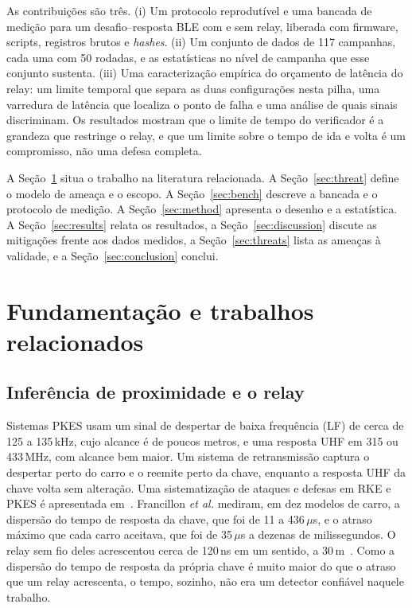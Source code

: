 \documentclass{ieeeaccess}
\begin{document}
As contribuições são três. (i) Um protocolo reprodutível e uma bancada de medição para um desafio--resposta BLE com e sem relay, liberada com firmware, scripts, registros brutos e \emph{hashes}. (ii) Um conjunto de dados de 117 campanhas, cada uma com 50 rodadas, e as estatísticas no nível de campanha que esse conjunto sustenta. (iii) Uma caracterização empírica do orçamento de latência do relay: um limite temporal que separa as duas configurações nesta pilha, uma varredura de latência que localiza o ponto de falha e uma análise de quais sinais discriminam. Os resultados mostram que o limite de tempo do verificador é a grandeza que restringe o relay, e que um limite sobre o tempo de ida e volta é um compromisso, não uma defesa completa.

A Seção~\ref{sec:background} situa o trabalho na literatura relacionada. A Seção~\ref{sec:threat} define o modelo de ameaça e o escopo. A Seção~\ref{sec:bench} descreve a bancada e o protocolo de medição. A Seção~\ref{sec:method} apresenta o desenho e a estatística. A Seção~\ref{sec:results} relata os resultados, a Seção~\ref{sec:discussion} discute as mitigações frente aos dados medidos, a Seção~\ref{sec:threats} lista as ameaças à validade, e a Seção~\ref{sec:conclusion} conclui.

\section{Fundamentação e trabalhos relacionados}
\label{sec:background}

\subsection{Inferência de proximidade e o relay}

Sistemas PKES usam um sinal de despertar de baixa frequência (LF) de cerca de 125 a 135\,kHz, cujo alcance é de poucos metros, e uma resposta UHF em 315 ou 433\,MHz, com alcance bem maior. Um sistema de retransmissão captura o despertar perto do carro e o reemite perto da chave, enquanto a resposta UHF da chave volta sem alteração. Uma sistematização de ataques e defesas em RKE e PKES é apresentada em~\cite{b2}. Francillon \emph{et al.} mediram, em dez modelos de carro, a dispersão do tempo de resposta da chave, que foi de 11 a 436\,$\mu$s, e o atraso máximo que cada carro aceitava, que foi de 35\,$\mu$s a dezenas de milissegundos. O relay sem fio deles acrescentou cerca de 120\,ns em um sentido, a 30\,m~\cite{b1}. Como a dispersão do tempo de resposta da própria chave é muito maior do que o atraso que um relay acrescenta, o tempo, sozinho, não era um detector confiável naquele trabalho.
\end{document}
